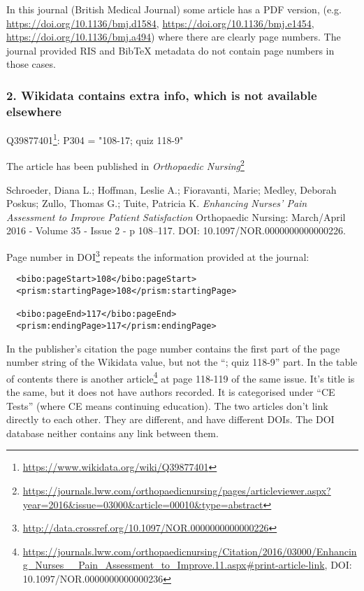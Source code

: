 In this journal (British Medical Journal) some article has a PDF version, (e.g. \url{https://doi.org/10.1136/bmj.d1584}, \url{https://doi.org/10.1136/bmj.e1454}, \url{https://doi.org/10.1136/bmj.a494}) where there are clearly page numbers. The journal provided RIS and BibTeX metadata do not contain page numbers in those cases.

\subsubsection{2. Wikidata contains extra info, which is not available elsewhere}

Q39877401\footnote{\url{https://www.wikidata.org/wiki/Q39877401}}: P304 = "108-17; quiz 118-9"

The article has been published in \emph{Orthopaedic Nursing}\footnote{\url{https://journals.lww.com/orthopaedicnursing/pages/articleviewer.aspx?year=2016&issue=03000&article=00010&type=abstract}}

Schroeder, Diana L.; Hoffman, Leslie A.; Fioravanti, Marie; Medley, Deborah Poskus; Zullo, Thomas G.; Tuite, Patricia K. \emph{Enhancing Nurses' Pain Assessment to Improve Patient Satisfaction} Orthopaedic Nursing: March/April 2016 - Volume 35 - Issue 2 - p 108–117. DOI: 10.1097/NOR.0000000000000226.

Page number in DOI\footnote{\url{http://data.crossref.org/10.1097/NOR.0000000000000226}} repeats the information provided at the journal:

\begin{lstlisting}
  <bibo:pageStart>108</bibo:pageStart>
  <prism:startingPage>108</prism:startingPage>

  <bibo:pageEnd>117</bibo:pageEnd>
  <prism:endingPage>117</prism:endingPage>
\end{lstlisting}

In the publisher's citation the page number contains the first part of the page number string of the Wikidata value, but not the ``; quiz 118-9'' part. In the table of contents there is another article\footnote{\url{https://journals.lww.com/orthopaedicnursing/Citation/2016/03000/Enhancing_Nurses__Pain_Assessment_to_Improve.11.aspx#print-article-link}, DOI: {10.1097/NOR.0000000000000236}} at page 118-119 of the same issue. It's title is the same, but it does not have authors recorded. It is categorised under ``CE Tests'' (where CE means continuing education). The two articles don't link directly to each other. They are different, and have different DOIs. The DOI database neither contains any link between them.

